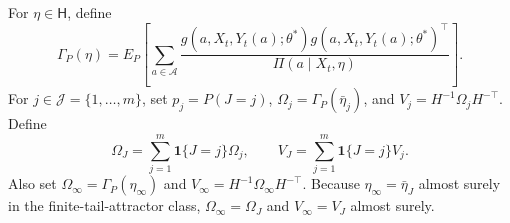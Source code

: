 For \(\eta\in\mathsf H\), define
\[
 \Gamma_P(\eta)=E_P\!\left[\sum_{a\in\mathcal A}
 \frac{g(a,X_t,Y_t(a);\theta^*)g(a,X_t,Y_t(a);\theta^*)^\top}
 {\Pi(a\mid X_t,\eta)}\right].
\]
For \(j\in\mathcal J=\{1,\ldots,m\}\), set \(p_j=P(J=j)\), \(\Omega_j=\Gamma_P(\bar\eta_j)\), and \(V_j=H^{-1}\Omega_jH^{-\top}\). Define
\[
 \Omega_J=\sum_{j=1}^m\mathbf 1\{J=j\}\Omega_j,
 \qquad
 V_J=\sum_{j=1}^m\mathbf 1\{J=j\}V_j.
\]
Also set \(\Omega_\infty=\Gamma_P(\eta_\infty)\) and \(V_\infty=H^{-1}\Omega_\infty H^{-\top}\). Because \(\eta_\infty=\bar\eta_J\) almost surely in the finite-tail-attractor class, \(\Omega_\infty=\Omega_J\) and \(V_\infty=V_J\) almost surely.